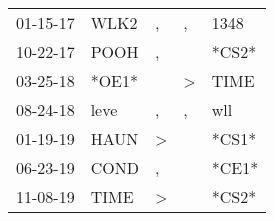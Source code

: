 \begin{supertabular}{lllll}
 01-15-17 &   WLK2 &             , &             , &   1348 \\
 10-22-17 &   POOH &             , &               &  *CS2* \\
 03-25-18 &  *OE1* &               &  \textgreater &   TIME \\
 08-24-18 &   leve &             , &             , &    wll \\
 01-19-19 &   HAUN &  \textgreater &               &  *CS1* \\
 06-23-19 &   COND &             , &               &  *CE1* \\
 11-08-19 &   TIME &  \textgreater &               &  *CS2* \\
\end{supertabular}

